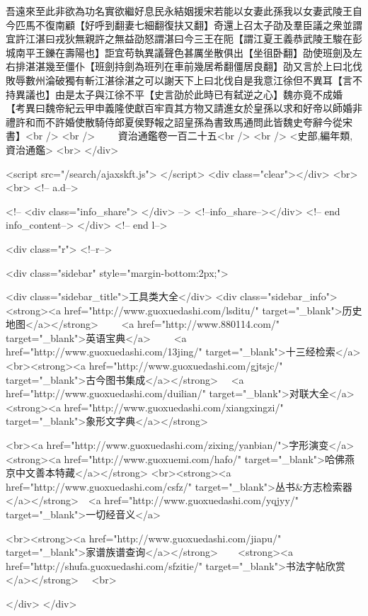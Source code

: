 吾遠來至此非欲為功名實欲繼好息民永結姻援宋若能以女妻此孫我以女妻武陵王自今匹馬不復南顧【好呼到翻妻七細翻復扶又翻】奇還上召太子劭及羣臣議之衆並謂宜許江湛曰戎狄無親許之無益劭怒謂湛曰今三王在阨【謂江夏王義恭武陵王駿在彭城南平王鑠在壽陽也】詎宜苟執異議聲色甚厲坐散俱出【坐徂卧翻】劭使班劍及左右排湛湛幾至僵仆【班劍持劍為班列在車前幾居希翻僵居良翻】劭又言於上曰北伐敗辱數州淪破獨有斬江湛徐湛之可以謝天下上曰北伐自是我意江徐但不異耳【言不持異議也】由是太子與江徐不平【史言劭於此時已有弑逆之心】魏亦竟不成婚　【考異曰魏帝紀云甲申義隆使獻百牢貢其方物又請進女於皇孫以求和好帝以師婚非禮許和而不許婚使散騎侍郎夏侯野報之詔皇孫為書致馬通問此皆魏史夸辭今從宋書】<br />
<br />
　　資治通鑑卷一百二十五<br />
<br />
<史部,編年類,資治通鑑>  <br>
   </div> 

<script src="/search/ajaxskft.js"> </script>
 <div class="clear"></div>
<br>
<br>
 <!-- a.d-->

 <!--
<div class="info_share">
</div> 
-->
 <!--info_share--></div>   <!-- end info_content-->
  </div> <!-- end l-->

<div class="r">   <!--r-->



<div class="sidebar"  style="margin-bottom:2px;">

 
<div class="sidebar_title">工具类大全</div>
<div class="sidebar_info">
<strong><a href="http://www.guoxuedashi.com/lsditu/" target="_blank">历史地图</a></strong>　　
<a href="http://www.880114.com/" target="_blank">英语宝典</a>　　
<a href="http://www.guoxuedashi.com/13jing/" target="_blank">十三经检索</a>　
<br><strong><a href="http://www.guoxuedashi.com/gjtsjc/" target="_blank">古今图书集成</a></strong>　
<a href="http://www.guoxuedashi.com/duilian/" target="_blank">对联大全</a>　<strong><a href="http://www.guoxuedashi.com/xiangxingzi/" target="_blank">象形文字典</a></strong>　

<br><a href="http://www.guoxuedashi.com/zixing/yanbian/">字形演变</a>　　<strong><a href="http://www.guoxuemi.com/hafo/" target="_blank">哈佛燕京中文善本特藏</a></strong>
<br><strong><a href="http://www.guoxuedashi.com/csfz/" target="_blank">丛书&方志检索器</a></strong>　<a href="http://www.guoxuedashi.com/yqjyy/" target="_blank">一切经音义</a>　　

<br><strong><a href="http://www.guoxuedashi.com/jiapu/" target="_blank">家谱族谱查询</a></strong>　　<strong><a href="http://shufa.guoxuedashi.com/sfzitie/" target="_blank">书法字帖欣赏</a></strong>　
<br>

</div>
</div>


